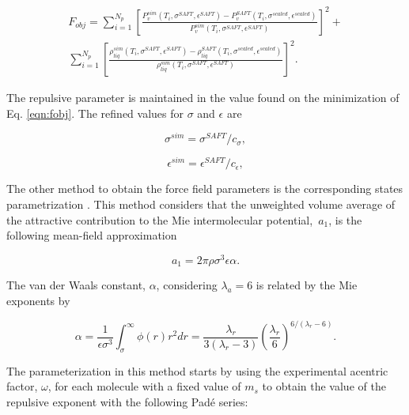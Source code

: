 \begin{equation}
\begin{split}
F_{obj}= \sum_{i=1}^{N_{p}} \left[\frac{P_{v}^{sim}(T_{i},\sigma^{SAFT},\epsilon^{SAFT})-P_{v}^{SAFT}(T_{i},\sigma^{scaled},\epsilon^{scaled})}{P_{v}^{sim}(T_{i},\sigma^{SAFT},\epsilon^{SAFT})} \right]^2 + \\
\sum_{i=1}^{N_{p}} \left[\frac{\rho_{liq}^{sim}(T_{i},\sigma^{SAFT},\epsilon^{SAFT})-\rho_{liq}^{SAFT}(T_{i},\sigma^{scaled},\epsilon^{scaled})}{\rho_{liq}^{sim}(T_{i},\sigma^{SAFT},\epsilon^{SAFT})} \right]^2 .
\end{split}
\label{eqn:fobjla}
\end{equation}

The repulsive parameter is maintained in the value found on the minimization of Eq. \eqref{eqn:fobj}. The refined values for $\sigma$ and $\epsilon$ are

\begin{equation}
\sigma^{sim} = \sigma^{SAFT}/c_{\sigma},
\label{eqn:simsigma}
\end{equation}

\begin{equation}
\epsilon^{sim} = \epsilon^{SAFT}/c_{\epsilon},
\label{eqn:simeps}
\end{equation}

The other method to obtain the force field parameters is the corresponding states parametrization \cite{mejia2014}. This method considers that the unweighted volume average of the attractive contribution to the Mie intermolecular potential, $ \, a_{1}$, is the following mean-field approximation

\begin{equation}
a_{1} = 2\pi\rho\sigma^{3}\epsilon\alpha .
\label{eqn:a1corres}
\end{equation}

The van der Waals constant, $\alpha$, considering $ \lambda_{a} = 6$ is related by the Mie exponents by

\begin{equation}
\alpha = \frac{1}{\epsilon\sigma^{3    }} \int_{\sigma}^{\infty} \phi(r)r^{2}dr = \frac{\lambda_{r}}{3(\lambda_{r}-3)}\left(\frac{\lambda_r}{6}\right)^{6/(\lambda_{r} - 6)}  .
\label{eqn:alpha}
\end{equation}

The parameterization in this method starts by using the experimental acentric factor, $\omega$, for each molecule with a fixed value of $ m_{s}$ to obtain the value of the repulsive exponent with the following Padé series:

